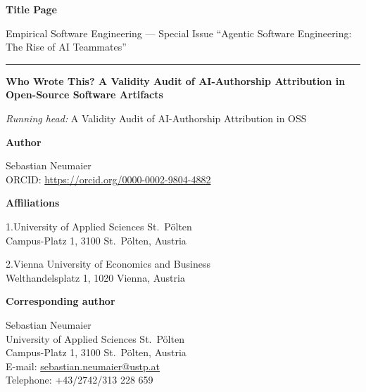 \documentclass[11pt,a4paper]{article}
\begin{document}
{\large\bfseries Title Page\par}
\vspace{4pt}
{\small Empirical Software Engineering --- Special Issue ``Agentic Software
Engineering: The Rise of AI Teammates''\par}

\vspace{18pt}
\hrule
\vspace{18pt}

{\bfseries\Large
Who Wrote This? A Validity Audit of AI-Authorship Attribution in Open-Source Software
Artifacts\par}

\vspace{6pt}
{\itshape Running head:} A Validity Audit of AI-Authorship Attribution in OSS

\vspace{20pt}
{\large\bfseries Author\par}
\vspace{4pt}

Sebastian Neumaier \\
ORCID: \url{https://orcid.org/0000-0002-9804-4882}

\vspace{14pt}
{\large\bfseries Affiliations\par}
\vspace{4pt}

1.\quad University of Applied Sciences St.\ P\"olten \\
\hspace*{1.5em} Campus-Platz 1, 3100 St.\ P\"olten, Austria

\vspace{6pt}
2.\quad Vienna University of Economics and Business \\
\hspace*{1.5em} Welthandelsplatz 1, 1020 Vienna, Austria

\vspace{14pt}
{\large\bfseries Corresponding author\par}
\vspace{4pt}

Sebastian Neumaier \\
University of Applied Sciences St.\ P\"olten \\
Campus-Platz 1, 3100 St.\ P\"olten, Austria \\
E-mail: \href{mailto:sebastian.neumaier@ustp.at}{sebastian.neumaier@ustp.at} \\
Telephone: +43/2742/313 228 659
\end{document}

